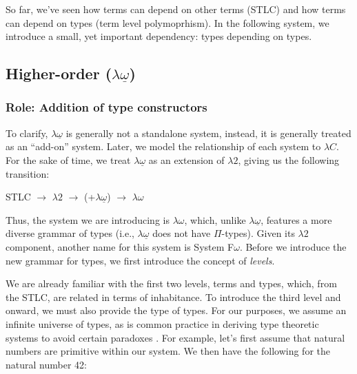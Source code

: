 \documentclass[12pt]{article}
\begin{document}

So far, we've seen how terms can depend on other terms (STLC) and how terms can
depend on types (term level polymoprhism). In the following system, we introduce
a small, yet important dependency: types depending on types.

\subsection*{Higher-order (\(\lambda\underline{\omega}\))}
\subsubsection*{Role: Addition of type constructors}

To clarify, \(\lambda\underline{\omega}\) is generally not a standalone system,
instead, it is generally treated as an ``add-on'' system. Later, we model the
relationship of each system to \(\lambda C\). For the sake of time, we treat
\(\lambda\underline{\omega}\) as an extension of \(\lambda2\), giving us the
following transition:

\begin{center}
\begin{minipage}{0.4\textwidth}
STLC \(\rightarrow\) \(\lambda2\) \(\rightarrow\) (+\(\lambda\underline{\omega}\)) \(\rightarrow\) \(\lambda\omega\)
\end{minipage}
\end{center}

Thus, the system we are introducing is \(\lambda\omega\), which, unlike
\(\lambda\underline{\omega}\), features a more diverse grammar of types (i.e.,
\(\lambda\underline{\omega}\) does not have \(\Pi\)-types). Given its \(\lambda2\)
component, another name for this system is System F\(\omega\). Before we introduce
the new grammar for types, we first introduce the concept of {\em levels}.

We are already familiar with the first two levels, terms and types, which, from
the STLC, are related in terms of inhabitance. To introduce the third level and
onward, we must also provide the type of types. For our purposes, we assume an
infinite universe of types, as is common practice in deriving type theoretic
systems to avoid certain paradoxes \cite{}. For example, let's first assume that
natural numbers are primitive within our system. We then have the following for
the natural number 42:
\end{document}
